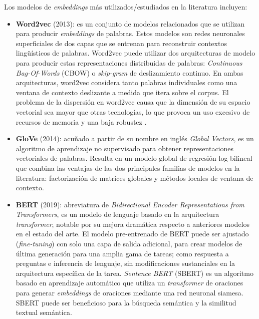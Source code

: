 Los modelos de \textit{embeddings} más utilizados/estudiados en la literatura incluyen:
\begin{itemize}
    \item \textbf{Word2vec} \cite{Mikolov2013EfficientEO} (2013): es un conjunto de modelos relacionados que se utilizan para producir \textit{embeddings} de palabras. Estos modelos son redes neuronales superficiales de dos capas que se entrenan para reconstruir contextos lingüísticos de palabras. Word2vec puede utilizar dos arquitecturas de modelo para producir estas representaciones distribuidas de palabras: \textit{Continuous Bag-Of-Words} (CBOW) o \textit{skip-gram} de deslizamiento continuo. En ambas arquitecturas, word2vec considera tanto palabras individuales como una ventana de contexto deslizante a medida que itera sobre el corpus. El problema de la dispersión en word2vec causa que la dimensión de su espacio vectorial sea mayor que otras tecnologías, lo que provoca un uso excesivo de recursos de memoria y una baja robustez \cite{Yuan2020ImprovingIR}.
    \item \textbf{GloVe} \cite{Pennington2014GloVeGV} (2014): acuñado a partir de su nombre en inglés \textit{Global Vectors}, es un algoritmo de aprendizaje no supervisado para obtener representaciones vectoriales de palabras. Resulta en un modelo global de regresión log-bilineal que combina las ventajas de las dos principales familias de modelos en la literatura: factorización de matrices globales y métodos locales de ventana de contexto.
    \item \textbf{BERT} \cite{Devlin2019BERTPO} (2019): abreviatura de \textit{Bidirectional Encoder Representations from Transformers}, es un modelo de lenguaje basado en la arquitectura \textit{transformer}, notable por su mejora dramática respecto a anteriores modelos en el estado del arte. El modelo pre-entrenado de BERT puede ser ajustado (\textit{fine-tuning}) con solo una capa de salida adicional, para crear modelos de última generación para una amplia gama de tareas; como respuesta a preguntas e inferencia de lenguaje, sin modificaciones sustanciales en la arquitectura específica de la tarea. \textit{Sentence BERT} (SBERT) \cite{Reimers2019SentenceBERTSE} es un algoritmo basado en aprendizaje automático que utiliza un \textit{transformer} de oraciones para generar \textit{embeddings} de oraciones mediante una red neuronal siamesa. SBERT puede ser beneficioso para la búsqueda semántica y la similitud textual semántica.
\end{itemize}

